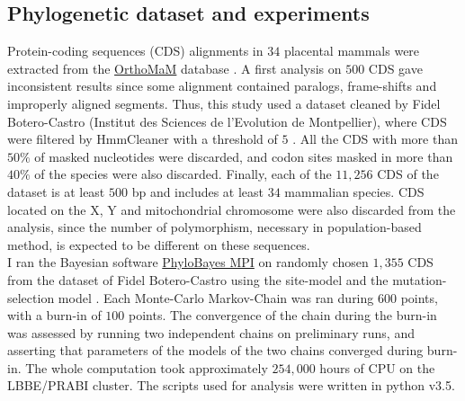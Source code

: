 \documentclass{article}
\begin{document}
	\subsection*{Phylogenetic dataset and experiments}
	Protein-coding sequences (CDS) alignments in $34$ placental mammals were extracted from the \href{http://www.orthomam.univ-montp2.fr}{OrthoMaM} database \cite{ranwez_orthomam:_2007, douzery_orthomam_2014}. A first analysis on $500$ CDS gave inconsistent results since some alignment contained paralogs, frame-shifts and improperly aligned segments. Thus, this study used a dataset cleaned by Fidel Botero-Castro (Institut des Sciences de l'Evolution de Montpellier), where CDS were filtered by HmmCleaner with a threshold of $5$ \cite{di_franco_detecting_2017}. All the CDS with more than $50\%$ of masked nucleotides were discarded, and codon sites masked in more than $40\%$ of the species were also discarded. Finally, each of the $11,256$ CDS of the dataset is at least $500$ bp and includes at least $34$ mammalian species. CDS located on the X, Y and mitochondrial chromosome were also discarded from the analysis, since the number of polymorphism, necessary in population-based method, is expected to be different on these sequences.\\
	
	I ran the Bayesian software \href{https://github.com/bayesiancook/pbmpi2}{PhyloBayes MPI} on randomly chosen $1,355$ CDS from the dataset of Fidel Botero-Castro using the site-model \cite{lartillot_phylobayes_2013} and the mutation-selection model \cite{rodrigue_site-heterogeneous_2014}. Each Monte-Carlo Markov-Chain was ran during $600$ points, with a burn-in of $100$ points. The convergence of the chain during the burn-in was assessed by running two independent chains on preliminary runs, and asserting that parameters of the models of the two chains converged during burn-in. The whole computation took approximately $254,000$ hours of CPU on the LBBE/PRABI cluster. The scripts used for analysis were written in python v3.5.
	
\end{document}
